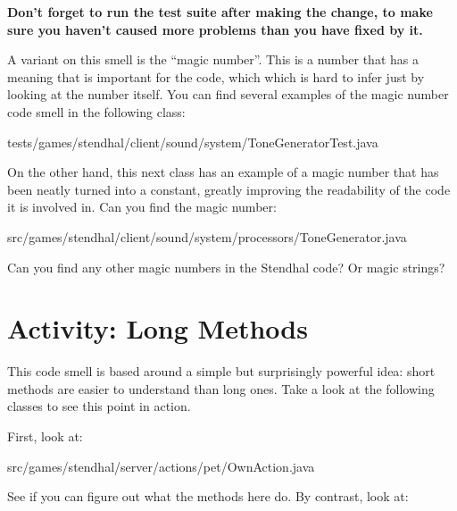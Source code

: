 \documentclass[
]{book}
\newenvironment{Shaded}{\begin{snugshade}}{\end{snugshade}}
\newcommand{\FunctionTok}[1]{\textcolor[rgb]{0.00,0.00,0.00}{#1}}
\newcommand{\NormalTok}[1]{#1}
\begin{document}
\textbf{Don't forget to run the test suite after making the change, to make sure you haven't caused more problems than you have fixed by it.}

A variant on this smell is the ``magic number''. This is a number that has a meaning that is important for the code, which which is hard to infer just by looking at the number itself. You can find several examples of the magic number code smell in the following class:

\begin{Shaded}
\begin{Highlighting}[]
\NormalTok{tests/games/stendhal/client/sound/system/ToneGeneratorTest.}\FunctionTok{java}
\end{Highlighting}
\end{Shaded}

On the other hand, this next class has an example of a magic number that has been neatly turned into a constant, greatly improving the readability of the code it is involved in. Can you find the magic number:

\begin{Shaded}
\begin{Highlighting}[]
\NormalTok{src/games/stendhal/client/sound/system/processors/ToneGenerator.}\FunctionTok{java}
\end{Highlighting}
\end{Shaded}

Can you find any other magic numbers in the Stendhal code? Or magic strings?

\hypertarget{longmethods}{%
\section{Activity: Long Methods}\label{longmethods}}

This code smell is based around a simple but surprisingly powerful idea: short methods are easier to understand than long ones. Take a look at the following classes to see this point in action.

First, look at:

\begin{Shaded}
\begin{Highlighting}[]
\NormalTok{src/games/stendhal/server/actions/pet/OwnAction.}\FunctionTok{java}
\end{Highlighting}
\end{Shaded}

See if you can figure out what the methods here do. By contrast, look at:
\end{document}

